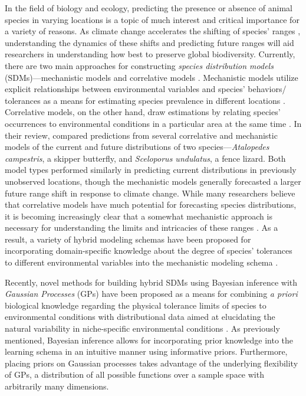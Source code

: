 \documentclass[
  12pt,
  oneside]{book}
\theoremstyle{definition}
\theoremstyle{definition}
\theoremstyle{definition}
\theoremstyle{remark}
\begin{document}
In the field of biology and ecology, predicting the presence or absence of animal species in varying locations is a topic of much interest and critical importance for a variety of reasons.
As climate change accelerates the shifting of species' ranges \citep[\citet{Steinbauer2018}]{Parmesan2003}, understanding the dynamics of these shifts and predicting future ranges will aid researchers in understanding how best to preserve global biodiversity.
Currently, there are two main approaches for constructing \emph{species distribution models} (SDMs)---mechanistic models and correlative models \citep[\citet{Kotta2019}]{Buckley2010}.
Mechanistic models utilize explicit relationships between environmental variables and species' behaviors/ tolerances as a means for estimating species prevalence in different locations \citep[\citet{Kotta2019}]{Buckley2010}.
Correlative models, on the other hand, draw estimations by relating species' occurrences to environmental conditions in a particular area at the same time \citep[\citet{Kotta2019}]{Buckley2010}.
In their review, \citet{Buckley2010} compared predictions from several correlative and mechanistic models of the current and future distributions of two species---\emph{Atalopedes campestris}, a skipper butterfly, and \emph{Sceloporus undulatus}, a fence lizard.
Both model types performed similarly in predicting current distributions in previously unobserved locations, though the mechanistic models generally forecasted a larger future range shift in response to climate change.
While many researchers believe that correlative models have much potential for forecasting species distributions, it is becoming increasingly clear that a somewhat mechanistic approach is necessary for understanding the limits and intricacies of these ranges \citep{Kearney2006}.
As a result, a variety of hybrid modeling schemas have been proposed for incorporating domain-specific knowledge about the degree of species' tolerances to different environmental variables into the mechanistic modeling schema \citep[\citet{Kearney2006}]{Buckley2010}.

Recently, novel methods for building hybrid SDMs using Bayesian inference with \emph{Gaussian Processes} (GPs) have been proposed as a means for combining \emph{a priori} biological knowledge regarding the physical tolerance limits of species to environmental conditions with distributional data aimed at elucidating the natural variability in niche-specific environmental conditions \citep{Kotta2019}.
As previously mentioned, Bayesian inference allows for incorporating prior knowledge into the learning schema in an intuitive manner using informative priors.
Furthermore, placing priors on Gaussian processes takes advantage of the underlying flexibility of GPs, a distribution of all possible functions over a sample space with arbitrarily many dimensions.
\end{document}
